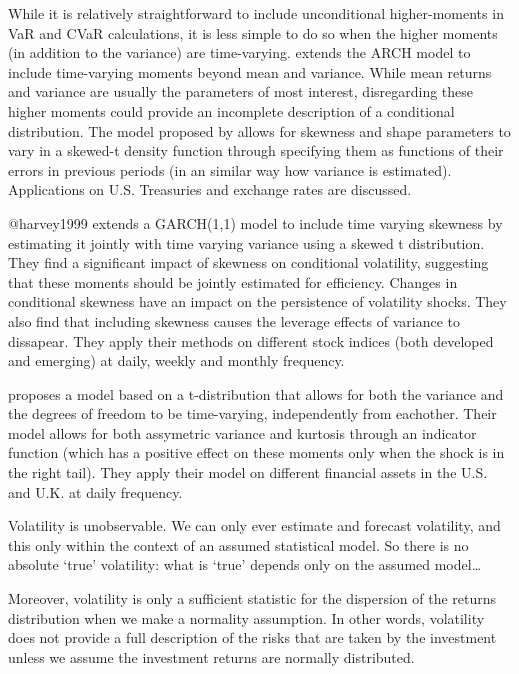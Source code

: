 \documentclass[a4paper, twoside]{templates/ociamthesis}
\begin{document}
While it is relatively straightforward to include unconditional higher-moments in VaR and CVaR calculations, it is less simple to do so when the higher moments (in addition to the variance) are time-varying. \textcite{hansen1994} extends the ARCH model to include time-varying moments beyond mean and variance. While mean returns and variance are usually the parameters of most interest, disregarding these higher moments could provide an incomplete description of a conditional distribution. The model proposed by \textcite{hansen1994} allows for skewness and shape parameters to vary in a skewed-t density function through specifying them as functions of their errors in previous periods (in an similar way how variance is estimated). Applications on U.S. Treasuries and exchange rates are discussed.

@harvey1999 extends a GARCH(1,1) model to include time varying skewness by estimating it jointly with time varying variance using a skewed t distribution. They find a significant impact of skewness on conditional volatility, suggesting that these moments should be jointly estimated for efficiency. Changes in conditional skewness have an impact on the persistence of volatility shocks. They also find that including skewness causes the leverage effects of variance to dissapear. They apply their methods on different stock indices (both developed and emerging) at daily, weekly and monthly frequency.

\textcite{brooks2005} proposes a model based on a t-distribution that allows for both the variance and the degrees of freedom to be time-varying, independently from eachother. Their model allows for both assymetric variance and kurtosis through an indicator function (which has a positive effect on these moments only when the shock is in the right tail). They apply their model on different financial assets in the U.S. and U.K. at daily frequency.

\begin{savequote}
Volatility is unobservable. We can only ever estimate and forecast
volatility, and this only within the context of an assumed statistical
model. So there is no absolute `true' volatility: what is `true' depends
only on the assumed model\ldots{}

Moreover, volatility is only a sufficient statistic for the dispersion
of the returns distribution when we make a normality assumption. In
other words, volatility does not provide a full description of the risks
that are taken by the investment unless we assume the investment returns
are normally distributed.
\end{savequote}
\end{document}
